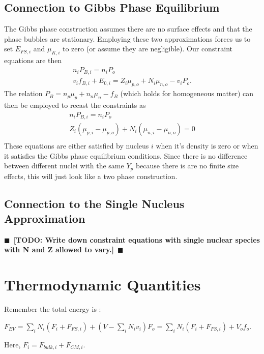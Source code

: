 \documentclass[11pt,letter]{article}
\newcommand{\todo}[1]{{$\blacksquare$~\textbf{\color{blue}[TODO: #1]}}~$\blacksquare$}
\begin{document}
\subsection{Connection to Gibbs Phase Equilibrium}
The Gibbs phase construction assumes there are no surface effects and that the
phase bubbles are stationary.  Employing these two approximations forces us to
set $E_{FS,i}$ and $\mu_{K,i}$ to zero (or assume they are negligible).  Our
constraint equations are then \begin{eqnarray}
n_i P_{B,i} = n_i P_o \\ 
v_i f_{B,i} + E_{0,i} =  Z_i \mu_{p,o} + N_i \mu_{n,o} - v_i P_o.
\end{eqnarray}
The relation $P_B = n_p \mu_p + n_n \mu_n - f_B$ (which holds for 
homogeneous matter) can then be employed to recast
the constraints as \begin{eqnarray}
n_i P_{B,i} = n_i P_o \\ 
Z_i \left(\mu_{p,i} - \mu_{p,o}\right) + N_i \left(\mu_{n,i} - \mu_{n,o}\right) = 0\\
\end{eqnarray}
These equations are either satisfied by nucleus $i$ when it's density is zero or
when it satisfies the Gibbs phase equilibrium conditions.  Since there is no
difference between different nuclei with the same $Y_p$ because there is are no
finite size effects, this will just look like a two phase construction.    

\subsection{Connection to the Single Nucleus Approximation} 
\todo{Write down constraint equations with single nuclear species with N and Z 
allowed to vary.}

\section{Thermodynamic Quantities} 
Remember the total energy is :

$F_{EV} = \sum_i N_i (F_i +F_{FS,i}) +(V- \sum_i N_i v_i) F_o = \sum_i N_i (F_i +F_{FS,i}) + V_o f_o$. 

Here, $F_i = F_{bulk, i} + F_{CM,i}$.
\end{document}
